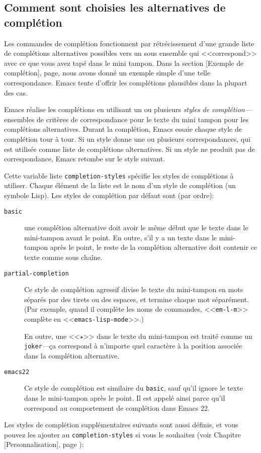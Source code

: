 \subsection{Comment sont choisies les alternatives de
  complétion} 

Les commandes de complétion fonctionnent par rétrécissement d'une
grande liste de complétions alternatives possibles vers un sous
ensemble qui <<correspond>> avec ce que vous avez tapé dans le mini
tampon. Dans la section  [Exemple de complétion],
page, nous avons donné un exemple simple d'une telle
correspondance. Emacs tente d'offrir les complétions plausibles dans
la plupart des cas.

Emacs réalise les complétions en utilisant un ou plusieurs
\textit{styles de complétion}---ensembles de critères de
correspondance pour le texte du mini tampon pour les complétions
alternatives. Durant la complétion, Emacs essaie chaque style de
complétion tour à tour. Si un style donne une ou plusieurs
correspondances, qui est utilisée comme liste de complétions
alternatives. Si un style ne produit pas de correspondance, Emacs
retombe sur le style suivant.

Cette variable liste \texttt{completion-styles} spécifie les styles de
complétions à utiliser. Chaque élément de la liste est le nom d'un
style de complétion (un symbole Lisp). Les styles de complétion par
défaut sont (par ordre):
\begin{description}
\item[\texttt{basic}] une complétion alternative doit avoir le même début que
  le texte dans le mini-tampon avant le point. En outre, s'il y a un
  texte dans le mini-tampon après le point, le reste de la complétion
  alternative doit contenir ce texte comme sous chaîne.
\item[\texttt{partial-completion}] 

Ce style de complétion agressif divise le texte du mini-tampon en mots
séparés par des tirets ou des espaces, et termine chaque mot
séparément. (Par exemple, quand il complète les noms de commandes,
<<\texttt{em-l-m}>> complète en <<\texttt{emacs-lisp-mode}>>.)

En outre, une <<$\star$>> dans le texte du mini-tampon est traité
comme un \texttt{joker}---ça correspond à n'importe quel caractère à
la position associée dans la complétion alternative.
\item[\texttt{emacs22}] Ce style de complétion est similaire du
  \texttt{basic}, sauf qu'il ignore le texte dans le mini-tampon après
  le point. Il est appelé ainsi parce qu'il correspond au comportement
  de complétion dans Emacs 22.
\end{description}
Les styles de complétion supplémentaires suivants sont aussi définis,
et vous pouvez les ajouter au \texttt{completion-styles} si vous le
souhaitez (voir Chapitre  [Personnalisation], page
):

